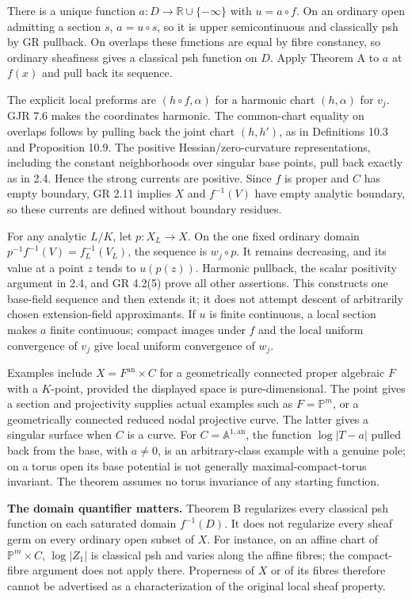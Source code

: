 \documentclass[11pt]{article}
\begin{document}
There is a unique function \(a:D\to\mathbb R\cup\{-\infty\}\) with \(u=a\circ f\). On an ordinary open admitting a section \(s\), \(a=u\circ s\), so it is upper semicontinuous and classically psh by GR pullback. On overlaps these functions are equal by fibre constancy, so ordinary sheafiness gives a classical psh function on \(D\). Apply Theorem A to \(a\) at \(f(x)\) and pull back its sequence.

The explicit local preforms are \((h\circ f,\alpha)\) for a harmonic chart \((h,\alpha)\) for \(v_j\). GJR 7.6 makes the coordinates harmonic. The common-chart equality on overlaps follows by pulling back the joint chart \((h,h')\), as in Definitions 10.3 and Proposition 10.9. The positive Hessian/zero-curvature representations, including the constant neighborhoods over singular base points, pull back exactly as in 2.4. Hence the strong currents are positive. Since \(f\) is proper and \(C\) has empty boundary, GR 2.11 implies \(X\) and \(f^{-1}(V)\) have empty analytic boundary, so these currents are defined without boundary residues.

For any analytic \(L/K\), let \(p:X_L\to X\). On the one fixed ordinary domain \(p^{-1}f^{-1}(V)=f_L^{-1}(V_L)\), the sequence is \(w_j\circ p\). It remains decreasing, and its value at a point \(z\) tends to \(u(p(z))\). Harmonic pullback, the scalar positivity argument in 2.4, and GR 4.2(5) prove all other assertions. This constructs one base-field sequence and then extends it; it does not attempt descent of arbitrarily chosen extension-field approximants. If \(u\) is finite continuous, a local section makes \(a\) finite continuous; compact images under \(f\) and the local uniform convergence of \(v_j\) give local uniform convergence of \(w_j\).

Examples include \(X=F^{\mathrm{an}}\times C\) for a geometrically connected proper algebraic \(F\) with a \(K\)-point, provided the displayed space is pure-dimensional. The point gives a section and projectivity supplies actual examples such as \(F=\mathbb P^m\), or a geometrically connected reduced nodal projective curve. The latter gives a singular surface when \(C\) is a curve. For \(C=\mathbb A^{1,\mathrm{an}}\), the function \(\log|T-a|\) pulled back from the base, with \(a\ne0\), is an arbitrary-class example with a genuine pole; on a torus open its base potential is not generally maximal-compact-torus invariant. The theorem assumes no torus invariance of any starting function.

\textbf{The domain quantifier matters.} Theorem B regularizes every classical psh function on each saturated domain \(f^{-1}(D)\). It does not regularize every sheaf germ on every ordinary open subset of \(X\). For instance, on an affine chart of \(\mathbb P^m\times C\), \(\log|Z_1|\) is classical psh and varies along the affine fibres; the compact-fibre argument does not apply there. Properness of \(X\) or of its fibres therefore cannot be advertised as a characterization of the original local sheaf property.
\end{document}
